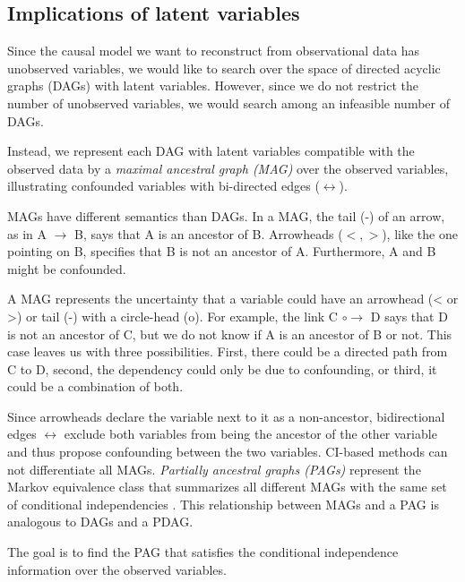 \documentclass[conference]{IEEEtran}
\begin{document}
\subsection{Implications of latent variables}
Since the causal model we want to reconstruct from observational data has unobserved variables, we would like to search over the space of directed acyclic graphs (DAGs) with latent variables.
However, since we do not restrict the number of unobserved variables, we would search among an infeasible number of DAGs.

Instead, we represent each DAG with latent variables compatible with the observed data by a \textit{maximal ancestral graph (MAG)} over the observed variables, illustrating confounded variables with bi-directed edges ($\leftrightarrow$)\cite{richardson_ancestral_2002}.

MAGs have different semantics than DAGs. In a MAG, the tail (-) of an arrow, as in A $\rightarrow$ B, says that A is an ancestor of B. Arrowheads ($<,>$), like the one pointing on B, specifies that B is not an ancestor of A. Furthermore, A and B might be confounded.

A MAG represents the uncertainty that a variable could have an arrowhead (< or >) or tail (-) with a circle-head (o). For example, the link C $\circ$$\rightarrow$ D says that D is not an ancestor of C, but we do not know if A is an ancestor of B or not. 
This case leaves us with three possibilities. First, there could be a directed path from C to D, second, the dependency could only be due to confounding, or third, it could be a combination of both.

Since arrowheads declare the variable next to it as a non-ancestor, bidirectional edges $\leftrightarrow$ exclude both variables from being the ancestor of the other variable and thus propose confounding between the two variables.
CI-based methods can not differentiate all MAGs.
\textit{Partially ancestral graphs (PAGs)} represent the Markov equivalence class that summarizes all different MAGs with the same set of conditional independencies \cite{zhang_causal_2008}.
This relationship between MAGs and a PAG is analogous to DAGs and a PDAG.

The goal is to find the PAG that satisfies the conditional independence information over the observed variables.
\end{document}
